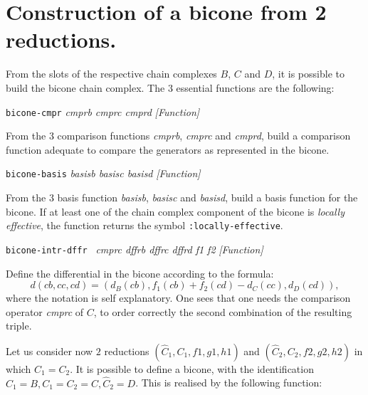 \section {Construction of a bicone from 2 reductions.}

From the slots of the respective chain complexes $B$, $C$ and $D$, it is possible to
build the bicone chain complex. The $3$ essential functions are the following:
\vskip 0.45cm
{\parindent=0mm
{\leftskip=5mm
{\tt bicone-cmpr} {\em cmprb cmprc cmprd} \hfill {\em [Function]} \par}
{\leftskip=15mm
From the $3$ comparison functions {\em cmprb}, {\em cmprc} and {\em cmprd}, build a
comparison function adequate to compare the generators as represented in the bicone. \par}
{\leftskip=5mm
{\tt bicone-basis} {\em basisb basisc basisd} \hfill {\em [Function]} \par}
{\leftskip=15mm
From the $3$ basis function {\em basisb}, {\em basisc} and {\em basisd}, build a
basis function for the bicone. If at least one of the chain complex component of
the bicone is {\em locally effective}, the function returns the symbol {\tt :locally-effective}. \par}
{\leftskip=5mm
{\tt bicone-intr-dffr } {\em cmprc dffrb dffrc dffrd f1 f2} \hfill {\em [Function]} \par}
{\leftskip=15mm
Define the differential in the bicone according to the formula:
$$d(cb, cc, cd)= (d_B(cb), f_1(cb) + f_2(cd) - d_C(cc), d_D(cd)),$$
where the notation is self explanatory. One sees that one needs the comparison operator
{\em cmprc} of $C$, to order correctly the second combination of the resulting triple. \par}
}
\vskip 0.35cm
Let us consider now $2$ reductions $(\hat C_1, C_1, f1, g1, h1)$ and $(\hat C_2, C_2, f2, g2, h2)$
in which $C_1 = C_2$. It is possible to define a bicone, with the identification
$\hat C_1=B, C_1=C_2=C, \hat C_2=D$. This is realised by the  following function:
\vskip 0.35cm
